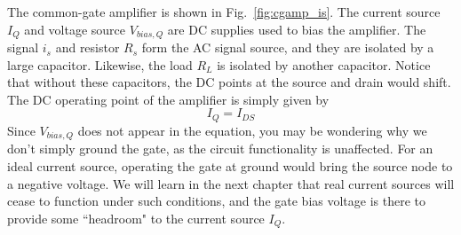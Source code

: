 The common-gate amplifier is shown in Fig.~\ref{fig:cgamp_is}.  The current source $I_Q$ and voltage source $V_{bias,Q}$ are DC supplies used to bias the amplifier.  The signal $i_s$ and resistor $R_s$ form the AC signal source, and they are isolated by a large capacitor.  Likewise, the load $R_L$ is isolated by another capacitor.  Notice that without these capacitors, the DC points at the source and drain would shift.  The DC operating point of the amplifier is simply given by
\begin{equation}
	{I_Q} = {I_{DS}}
\end{equation}
Since $V_{bias,Q}$ does not appear in the equation, you may be wondering why we don't simply ground the gate, as the circuit functionality is unaffected.  For an ideal current source, operating the gate at ground would bring the source node to a negative voltage.  We will learn in the next chapter that real current sources will cease to function under such conditions, and the gate bias voltage is there to provide some ``headroom" to the current source $I_Q$.
